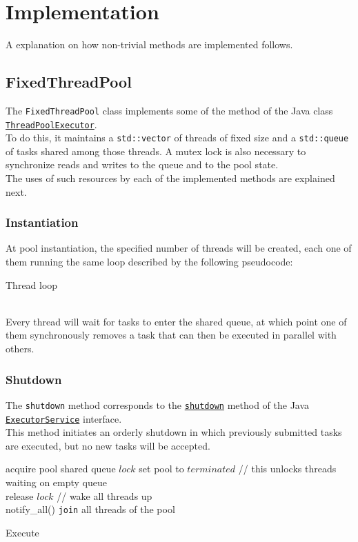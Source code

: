 \documentclass[10pt,twocolumn,letterpaper]{article}
\begin{document}
	\section{Implementation}
	A explanation on how non-trivial methods are implemented follows.
	\subsection{FixedThreadPool}
	The \lstinline|FixedThreadPool| class implements some of the method of the Java class \href{https://docs.oracle.com/javase/7/docs/api/java/util/concurrent/ThreadPoolExecutor.html}{\lstinline|ThreadPoolExecutor|}.\\
	To do this, it maintains a \lstinline|std::vector| of threads of fixed size and a \lstinline|std::queue| of tasks shared among those threads. A mutex lock is also necessary to synchronize reads and writes to the queue and to the pool state.\\
	The uses of such resources by each of the implemented methods are explained next.
	\subsubsection{Instantiation}
	At pool instantiation, the specified number of threads will be created, each one of them running the same loop described by the following pseudocode:
	\begin{algorithm}
		\SetAlgoLined
		\caption{Thread loop}
		\label{pseudo:threads}
	\end{algorithm}\\
	Every thread will wait for tasks to enter the shared queue, at which point one of them synchronously removes a task that can then be executed in parallel with others.
	\subsubsection{Shutdown}
	The \lstinline|shutdown| method corresponds to the  \href{https://docs.oracle.com/javase/7/docs/api/java/util/concurrent/ExecutorService.html#shutdown()}{\lstinline{shutdown}} method of the Java  \href{https://docs.oracle.com/javase/7/docs/api/java/util/concurrent/ExecutorService.html}{\lstinline{ExecutorService}} interface.\\
	This method initiates an orderly shutdown in which previously submitted tasks are executed, but no new tasks will be accepted.
	\begin{algorithm}
		\SetAlgoLined
		acquire pool shared queue $lock$\;
		set pool to $terminated$\;
		// this unlocks threads waiting on empty queue\\
		release $lock$\;
		// wake all threads up\\
		notify\_all()\;
		\lstinline|join| all threads of the pool\;
		\caption{Execute}
		\label{pseudo:execute}
	\end{algorithm}
\end{document}
